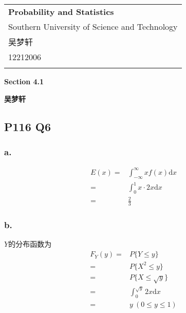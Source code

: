 \documentclass[a4paper,12pt]{ctexart}
\begin{document}
\thispagestyle{empty} %

\begin{tabular}{p{15.5cm}}
{\large \bf Probability and Statistics} \\
Southern University of Science and Technology \\ 吴梦轩 \\ 12212006 \\
\hline
\\
\end{tabular}

\vspace*{0.3cm} %

\begin{center}
	{\Large \bf Section 4.1}
	\vspace{2mm}

	{\bf 吴梦轩}
		
\end{center}  

\vspace{0.4cm}

\subsection*{P116 Q6}

\subsubsection*{a.}

\begin{align*}
	E(x) =& \int_{-\infty}^{\infty} xf(x) \mathrm{d}x \\
	=& \int_{0}^{1} x \cdot 2x \mathrm{d}x \\
	=& \frac{2}{3}
\end{align*}

\subsubsection*{b.}

$Y$的分布函数为
\begin{align*}
	F_Y(y) =& P\{Y \leq y\} \\
	=& P\{X^2 \leq y\} \\
	=& P\{X \leq \sqrt{y}\} \\
	=& \int_{0}^{\sqrt{y}} 2x \mathrm{d}x \\
	=& y\ (0 \leq y \leq 1)
\end{align*}
\end{document}
